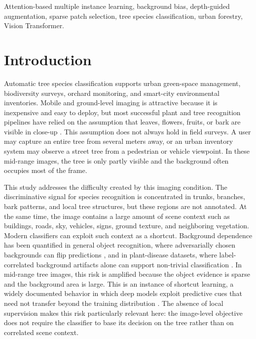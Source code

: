 \documentclass{ieeeaccess}
\begin{document}
\begin{keywords}
Attention-based multiple instance learning, background bias, depth-guided augmentation, sparse patch
selection, tree species classification, urban forestry, Vision Transformer.
\end{keywords}

\titlepgskip=-15pt
\maketitle

\section{Introduction}
\label{sec:introduction}

Automatic tree species classification supports urban green-space management, biodiversity surveys,
orchard monitoring, and smart-city environmental inventories. Mobile and ground-level imaging is
attractive because it is inexpensive and easy to deploy, but most successful plant and tree
recognition pipelines have relied on the assumption that leaves, flowers, fruits, or bark are
visible in close-up \cite{leafsnap,plantnet,plantnetlatest,barknet,centralbark}. This assumption
does not always hold in field surveys. A user may capture an entire tree from several meters away,
or an urban inventory system may observe a street tree from a pedestrian or vehicle viewpoint. In
these mid-range images, the tree is only partly visible and the background often occupies most of
the frame.

This study addresses the difficulty created by this imaging condition. The discriminative signal for
species recognition is concentrated in trunks, branches, bark patterns, and local tree structures,
but these regions are not annotated. At the same time, the image contains a large amount of scene
context such as buildings, roads, sky, vehicles, signs, ground texture, and neighboring vegetation.
Modern classifiers can exploit such context as a shortcut. Background dependence has been quantified
in general object recognition, where adversarially chosen backgrounds can flip predictions
\cite{backgroundbias}, and in plant-disease datasets, where label-correlated background artifacts
alone can support non-trivial classification \cite{plantvillagebias}. In mid-range tree images, this
risk is amplified because the object evidence is sparse and the background area is large. This is
an instance of shortcut learning, a widely documented behavior in which deep models exploit
predictive cues that need not transfer beyond the training distribution \cite{shortcutlearning}.
The absence of local supervision makes this risk particularly relevant here: the image-level
objective does not require the classifier to base its decision on the tree rather than on correlated
scene context.
\end{document}
